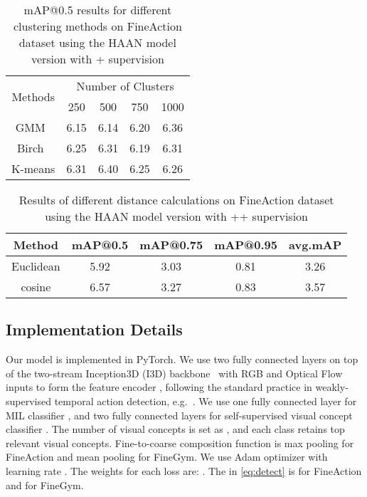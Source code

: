 \begin{table}[t]
  \setlength{\tabcolsep}{6pt}
  \centering
  \caption{mAP@0.5 results for different clustering methods on FineAction dataset using the HAAN model version with + supervision}
  \begin{tabular}{c|cccc}
    \hline
     \multirow{2}{*}{Methods}& \multicolumn{4}{c}{Number of Clusters} \\
     & 250 & 500 & 750 & 1000 \\
    \hline
     GMM~\cite{reynolds2009gaussian} & 6.15 & 6.14 & 6.20 & 6.36\\
     Birch~\cite{zhang1996birch} & 6.25 & 6.31 & 6.19 & 6.31\\
     K-means \cite{macqueen1967classification} & 6.31 & 6.40 & 6.25 & 6.26\\
    \hline
  \end{tabular}
  
  \label{tab:results:clustering}
\end{table}


\begin{table}[t]
  \setlength{\tabcolsep}{6pt}
  \centering
  \caption{Results of different distance calculations on FineAction dataset using the HAAN model version with ++ supervision}
  \begin{tabular}{c|ccc|c}
    \hline
   Method & mAP@0.5 & mAP@0.75 & mAP@0.95 & avg.mAP\\
    \hline
     Euclidean & 5.92 & 3.03 & 0.81 & 3.26\\
     cosine & 6.57 & 3.27 & 0.83 & 3.57\\
    \hline
  \end{tabular}
  
  \label{tab:results:mse}
\end{table}



\subsection{Implementation Details}
Our model is implemented in PyTorch. We use two fully connected layers on top of the two-stream Inception3D (I3D) backbone~\cite{carreira2017quo} with RGB and Optical Flow inputs to form the feature encoder , following the standard practice in weakly-supervised temporal action detection, e.g.~\cite{nguyen2018weakly}. We use one fully connected layer for MIL classifier , and two fully connected layers for self-supervised visual concept classifier . The number of visual concepts  is set as , and each class retains top  relevant visual concepts. Fine-to-coarse composition function  is max pooling for FineAction and mean pooling for FineGym. We use Adam optimizer with learning rate . The weights for each loss are: . The  in \cref{eq:detect} is  for FineAction and  for FineGym.


